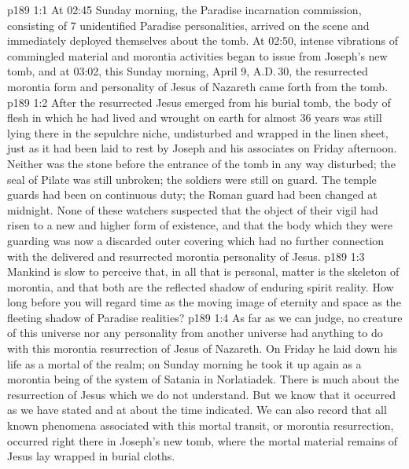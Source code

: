 \vs p189 1:1 At 02:45 Sunday morning, the Paradise incarnation commission, consisting of 7 unidentified Paradise personalities, arrived on the scene and immediately deployed themselves about the tomb. At 02:50, intense vibrations of commingled material and morontia activities began to issue from Joseph’s new tomb, and at 03:02, this Sunday morning, April 9, A.D.\,30, the resurrected morontia form and personality of Jesus of Nazareth came forth from the tomb.
\vs p189 1:2 After the resurrected Jesus emerged from his burial tomb, the body of flesh in which he had lived and wrought on earth for almost 36 years was still lying there in the sepulchre niche, undisturbed and wrapped in the linen sheet, just as it had been laid to rest by Joseph and his associates on Friday afternoon. Neither was the stone before the entrance of the tomb in any way disturbed; the seal of Pilate was still unbroken; the soldiers were still on guard. The temple guards had been on continuous duty; the Roman guard had been changed at midnight. None of these watchers suspected that the object of their vigil had risen to a new and higher form of existence, and that the body which they were guarding was now a discarded outer covering which had no further connection with the delivered and resurrected morontia personality of Jesus.
\vs p189 1:3 \pc Mankind is slow to perceive that, in all that is personal, matter is the skeleton of morontia, and that both are the reflected shadow of enduring spirit reality. How long before you will regard time as the moving image of eternity and space as the fleeting shadow of Paradise realities?
\vs p189 1:4 As far as we can judge, no creature of this universe nor any personality from another universe had anything to do with this morontia resurrection of Jesus of Nazareth. On Friday he laid down his life as a mortal of the realm; on Sunday morning he took it up again as a morontia being of the system of Satania in Norlatiadek. There is much about the resurrection of Jesus which we do not understand. But we know that it occurred as we have stated and at about the time indicated. We can also record that all known phenomena associated with this mortal transit, or morontia resurrection, occurred right there in Joseph’s new tomb, where the mortal material remains of Jesus lay wrapped in burial cloths.

